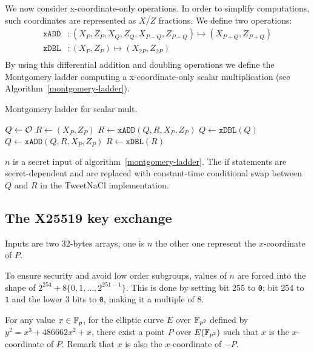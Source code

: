 We now consider x-coordinate-only operations. In order to simplify computations,
such coordinates are represented as $X/Z$ fractions. We define two operations:
\begin{align*}
\texttt{xADD} &: (X_P, Z_P, X_Q , Z_Q, X_{P-Q}, Z_{P-Q}) \mapsto (X_{P+Q}, Z_{P+Q})\\
\texttt{xDBL} &: (X_P, Z_P) \mapsto (X_{2P}, Z_{2P})\\
\end{align*}
By using this differential addition and doubling operations we define the Montgomery ladder
computing a x-coordinate-only scalar multiplication (see Algorithm~\ref{montgomery-ladder}).
\begin{algorithm}
\caption{Montgomery ladder for scalar mult.}
\label{montgomery-ladder}
\begin{algorithmic}
\STATE $Q \leftarrow \mathcal{O}$
\STATE $R \leftarrow (X_P,Z_P)$
    \STATE $R \leftarrow \texttt{xADD}(Q,R,X_P,Z_P)$
    \STATE $Q \leftarrow \texttt{xDBL}(Q)$
  \ELSE
    \STATE $Q \leftarrow \texttt{xADD}(Q,R,X_P,Z_P)$
    \STATE $R \leftarrow \texttt{xDBL}(R)$
  \ENDIF
\ENDFOR
\end{algorithmic}
\end{algorithm}
$n$ is a secret input of algorithm~\ref{montgomery-ladder}.
The if statements are secret-dependent and are replaced with constant-time
conditional swap between $Q$ and $R$ in the TweetNaCl implementation.

\subsection{The X25519 key exchange}
\label{preliminaries:A}


Inputs are two 32-bytes arrays, one is $n$ the other one represent
the $x$-coordinate of $P$.

To ensure security and avoid low order subgroups, values of $n$ are forced
into the shape of $2^{254} + 8\{0,1,\ldots,2^{251-1}\}$.
This is done by setting bit 255 to \texttt{0}; bit 254 to \texttt{1} and the lower
3 bits to \texttt{0}, making it a multiple of 8.

For any value $x \in \mathbb{F}_{p}$, for the elliptic curve $E$ over $\mathbb{F}_{p^2}$
defined by $y^2 = x^3 + 486662 x^2 + x$, there exist a point $P$ over $E(\mathbb{F}_{p^2})$
such that $x$ is the $x$-coordinate of $P$.
Remark that $x$ is also the $x$-coordinate of $-P$.

